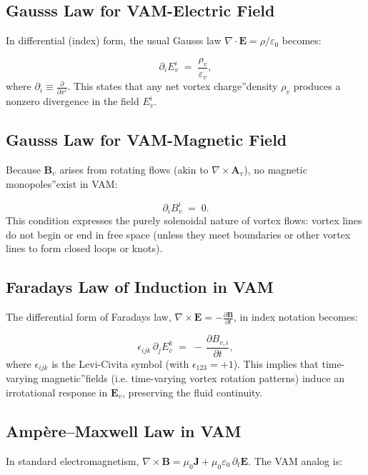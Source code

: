 \subsection{Gauss\rqs s Law for VAM-Electric Field}

In differential (index) form, the usual Gauss\rqs s law \(\nabla\cdot\mathbf{E} = \rho/\varepsilon_0\) becomes:

\[
    \partial_i E_{v}^i
    \;=\;
    \frac{\rho_v}{\varepsilon_v},
    \tag{1}
\]
where \(\partial_i \equiv \frac{\partial}{\partial x^i}\). This states that any net vortex \grqq charge\textquotedblright density \(\rho_v\) produces a nonzero divergence in the field \(E_{v}^i\).

\subsection{Gauss\rqs s Law for VAM-Magnetic Field}

Because \(\mathbf{B}_v\) arises from rotating flows (akin to \(\nabla\times \mathbf{A}_v\)), no \grqq magnetic monopoles\textquotedblright exist in VAM:

\[
    \partial_i B_{v}^i
    \;=\; 0.
    \tag{2}
\]
This condition expresses the purely solenoidal nature of vortex flows: vortex lines do not begin or end in free space (unless they meet boundaries or other vortex lines to form closed loops or knots).

\subsection{Faraday\rqs s Law of Induction in VAM}

The differential form of Faraday\rqs s law, \(\nabla\times \mathbf{E} = -\frac{\partial \mathbf{B}}{\partial t}\), in index notation becomes:

\[
    \epsilon_{ijk}\,\partial_j E_{v}^k
    \;=\;
    -\,\frac{\partial B_{v,i}}{\partial t},
    \tag{3}
\]
where \(\epsilon_{ijk}\) is the Levi-Civita symbol (with \(\epsilon_{123} = +1\)). This implies that time-varying \grqq magnetic\textquotedblright fields (i.e. time-varying vortex rotation patterns) induce an irrotational response in \(\mathbf{E}_v\), preserving the fluid continuity.

\subsection{Ampère--Maxwell Law in VAM}

In standard electromagnetism, \(\nabla\times \mathbf{B} = \mu_0 \mathbf{J} + \mu_0\varepsilon_0\,\partial_t\mathbf{E}\). The VAM analog is:

